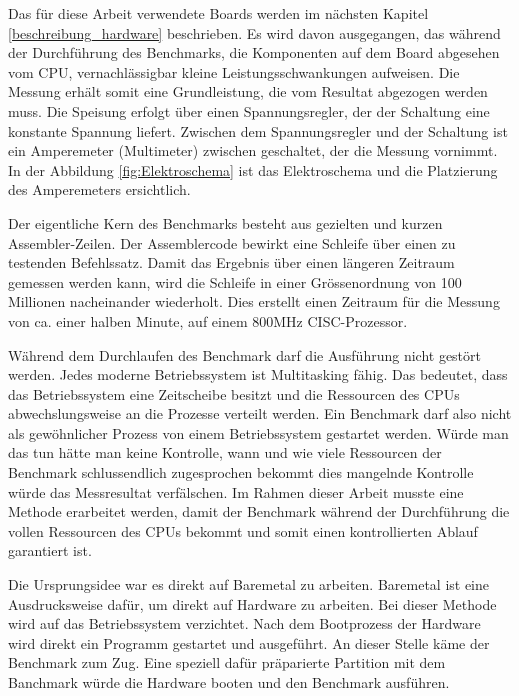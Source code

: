 Das für diese Arbeit verwendete Boards werden im nächsten Kapitel \autoref{beschreibung_hardware} beschrieben. Es wird davon ausgegangen, das während der Durchführung des Benchmarks, die Komponenten auf dem Board abgesehen vom CPU, vernachlässigbar kleine Leistungsschwankungen aufweisen. Die Messung erhält somit eine Grundleistung, die vom Resultat abgezogen werden muss. Die Speisung erfolgt über einen Spannungsregler, der der Schaltung eine konstante Spannung liefert. Zwischen dem Spannungsregler und der Schaltung ist ein Amperemeter (Multimeter) zwischen geschaltet, der die Messung vornimmt. In der Abbildung \ref{fig:Elektroschema} ist das Elektroschema und die Platzierung des Amperemeters ersichtlich.
\par
Der eigentliche Kern des Benchmarks besteht aus gezielten und kurzen Assembler-Zeilen. Der Assemblercode bewirkt eine Schleife über einen zu testenden Befehlssatz. Damit das Ergebnis über einen längeren Zeitraum gemessen werden kann, wird die Schleife in einer Grössenordnung von 100 Millionen nacheinander wiederholt. Dies erstellt einen Zeitraum für die Messung von ca. einer halben Minute, auf einem 800MHz CISC-Prozessor.
\par
Während dem Durchlaufen des Benchmark darf die Ausführung nicht gestört werden. Jedes moderne Betriebssystem ist Multitasking fähig. Das bedeutet, dass das Betriebssystem eine Zeitscheibe besitzt und die Ressourcen des CPUs abwechslungsweise an die Prozesse verteilt werden. Ein Benchmark darf also nicht als gewöhnlicher Prozess von einem Betriebssystem gestartet werden. Würde man das tun hätte man keine Kontrolle, wann und wie viele Ressourcen der Benchmark schlussendlich zugesprochen bekommt dies mangelnde Kontrolle würde das Messresultat verfälschen. Im Rahmen dieser Arbeit musste eine Methode erarbeitet werden, damit der Benchmark während der Durchführung die vollen Ressourcen des CPUs bekommt und somit einen kontrollierten Ablauf garantiert ist.
\par
Die Ursprungsidee war es direkt auf Baremetal zu arbeiten. Baremetal ist eine Ausdrucksweise dafür, um direkt auf Hardware zu arbeiten. Bei dieser Methode wird auf das Betriebssystem verzichtet. Nach dem Bootprozess der Hardware wird direkt ein Programm gestartet und ausgeführt. An dieser Stelle käme der Benchmark zum Zug. Eine speziell dafür präparierte Partition mit dem Banchmark würde die Hardware booten und den Benchmark ausführen.
\par
